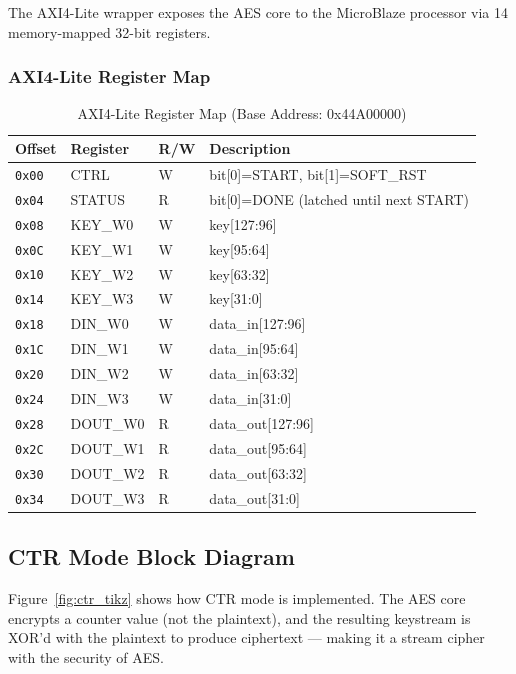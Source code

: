 The AXI4-Lite wrapper exposes the AES core to the MicroBlaze processor via 14 memory-mapped 32-bit registers.

\subsubsection{AXI4-Lite Register Map}

\begin{table}[H]
\centering
\caption{AXI4-Lite Register Map (Base Address: 0x44A00000)}
\begin{tabular}{lllp{5cm}}
\toprule
\textbf{Offset} & \textbf{Register} & \textbf{R/W} & \textbf{Description} \\
\midrule
\texttt{0x00} & CTRL    & W & bit[0]=START, bit[1]=SOFT\_RST \\
\texttt{0x04} & STATUS  & R & bit[0]=DONE (latched until next START) \\
\texttt{0x08} & KEY\_W0 & W & key[127:96] \\
\texttt{0x0C} & KEY\_W1 & W & key[95:64] \\
\texttt{0x10} & KEY\_W2 & W & key[63:32] \\
\texttt{0x14} & KEY\_W3 & W & key[31:0] \\
\texttt{0x18} & DIN\_W0 & W & data\_in[127:96] \\
\texttt{0x1C} & DIN\_W1 & W & data\_in[95:64] \\
\texttt{0x20} & DIN\_W2 & W & data\_in[63:32] \\
\texttt{0x24} & DIN\_W3 & W & data\_in[31:0] \\
\texttt{0x28} & DOUT\_W0 & R & data\_out[127:96] \\
\texttt{0x2C} & DOUT\_W1 & R & data\_out[95:64] \\
\texttt{0x30} & DOUT\_W2 & R & data\_out[63:32] \\
\texttt{0x34} & DOUT\_W3 & R & data\_out[31:0] \\
\bottomrule
\end{tabular}
\end{table}

\subsection{CTR Mode Block Diagram}

Figure~\ref{fig:ctr_tikz} shows how CTR mode is implemented. The AES core encrypts a counter value (not the plaintext), and the resulting keystream is XOR'd with the plaintext to produce ciphertext --- making it a stream cipher with the security of AES.

